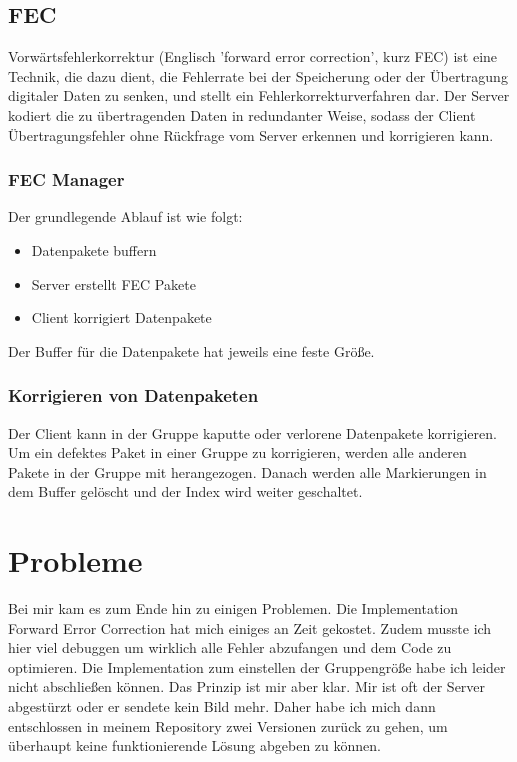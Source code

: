 \subsection{FEC}
Vorwärtsfehlerkorrektur (Englisch 'forward error correction', kurz FEC) ist eine Technik, die dazu dient, die Fehlerrate bei der Speicherung oder der Übertragung digitaler Daten zu senken, und stellt ein Fehlerkorrekturverfahren dar. Der Server kodiert die zu übertragenden Daten in redundanter Weise, sodass der Client Übertragungsfehler ohne Rückfrage vom Server erkennen und korrigieren kann.

\subsubsection*{FEC Manager}
Der grundlegende Ablauf ist wie folgt:
\begin{itemize}
	\item Datenpakete buffern
	\item Server erstellt FEC Pakete
	\item Client korrigiert Datenpakete
\end{itemize}
Der Buffer für die Datenpakete hat jeweils eine feste Größe.

\subsubsection*{Korrigieren von Datenpaketen}
Der Client kann in der Gruppe kaputte oder verlorene Datenpakete korrigieren. Um ein defektes Paket in einer Gruppe zu korrigieren, werden alle anderen Pakete in der Gruppe mit herangezogen. Danach werden alle Markierungen in dem Buffer gelöscht und der Index wird weiter geschaltet.
\section{Probleme}
Bei mir kam es zum Ende hin zu einigen Problemen. Die Implementation Forward Error Correction hat mich einiges an Zeit gekostet. Zudem musste ich hier viel debuggen um wirklich alle Fehler abzufangen und dem Code zu optimieren. Die Implementation zum einstellen der Gruppengröße habe ich leider nicht abschließen können. Das Prinzip ist mir aber klar. Mir ist oft der Server abgestürzt oder er sendete kein Bild mehr. Daher habe ich mich dann entschlossen in meinem Repository zwei Versionen zurück zu gehen, um überhaupt keine funktionierende Lösung abgeben zu können. 


